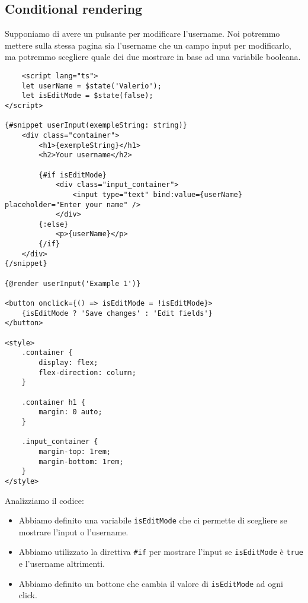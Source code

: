 \documentclass[12pt]{article}
\begin{document}
\subsection{Conditional rendering}
Supponiamo di avere un pulsante per modificare l'username.
Noi potremmo mettere sulla stessa pagina sia l'username
che un campo input per modificarlo, ma potremmo scegliere
quale dei due mostrare in base ad una variabile booleana.
\begin{verbatim}
    <script lang="ts">
    let userName = $state('Valerio');
    let isEditMode = $state(false);
</script>

{#snippet userInput(exempleString: string)}
    <div class="container">
        <h1>{exempleString}</h1>
        <h2>Your username</h2>

        {#if isEditMode}
            <div class="input_container">
                <input type="text" bind:value={userName} placeholder="Enter your name" />
            </div>
        {:else}
            <p>{userName}</p>
        {/if}
    </div>
{/snippet}

{@render userInput('Example 1')}

<button onclick={() => isEditMode = !isEditMode}>
    {isEditMode ? 'Save changes' : 'Edit fields'}
</button>

<style>
    .container {
        display: flex;
        flex-direction: column;
    }

    .container h1 {
        margin: 0 auto;
    }

    .input_container {
        margin-top: 1rem;
        margin-bottom: 1rem;
    }
</style>
\end{verbatim}
Analizziamo il codice:
\begin{itemize}
    \item Abbiamo definito una variabile \texttt{isEditMode} che ci permette
    di scegliere se mostrare l'input o l'username.
    \item Abbiamo utilizzato la direttiva \texttt{\#if} per mostrare l'input
    se \texttt{isEditMode} è \texttt{true} e l'username altrimenti.
    \item Abbiamo definito un bottone che cambia il valore di \texttt{isEditMode}
    ad ogni click.
\end{itemize}

\pagebreak
\end{document}
